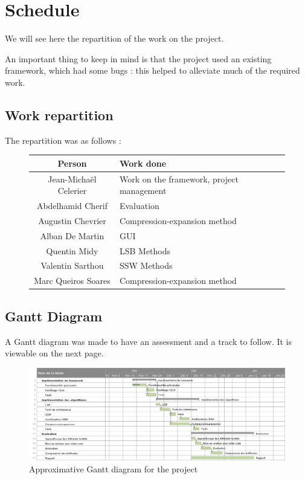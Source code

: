\section{Schedule}
We will see here the repartition of the work on the project.

An important thing to keep in mind is that the project used an existing framework, which had some bugs : this helped to alleviate much of the required work.

\subsection{Work repartition}
The repartition was as follows : 
\begin{figure}[h!]
\centering
\begin{tabular}{|c|l|}
\hline
Person & Work done \\
\hline
Jean-Michaël Celerier & Work on the framework, project management \\
Abdelhamid Cherif & Evaluation \\
Augustin Chevrier & Compression-expansion method \\
Alban De Martin & \ac{GUI} \\
Quentin Midy & \ac{LSB} Methods \\
Valentin Sarthou & \ac{SSW} Methods \\
Marc Queiros Soares & Compression-expansion method \\
\hline
\end{tabular}
\end{figure}

\subsection{Gantt Diagram}
A Gantt diagram was made to have an assessment and a track to follow. It is viewable on the next page.

\begin{figure}
\centering
\includegraphics[scale=0.65]{images/gantt.png}
\caption{Approximative Gantt diagram for the project}
\label{gantt}
\end{figure}
